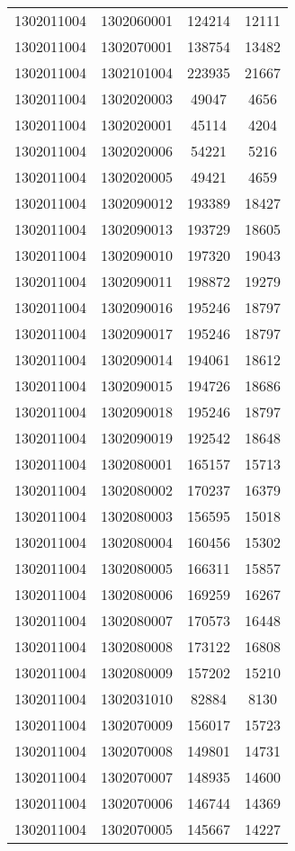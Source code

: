 \begin{longtable}{llcc}
1302011004 & 1302060001 & 124214 & 12111\\
1302011004 & 1302070001 & 138754 & 13482\\
1302011004 & 1302101004 & 223935 & 21667\\
1302011004 & 1302020003 & 49047 & 4656\\
1302011004 & 1302020001 & 45114 & 4204\\
1302011004 & 1302020006 & 54221 & 5216\\
1302011004 & 1302020005 & 49421 & 4659\\
1302011004 & 1302090012 & 193389 & 18427\\
1302011004 & 1302090013 & 193729 & 18605\\
1302011004 & 1302090010 & 197320 & 19043\\
1302011004 & 1302090011 & 198872 & 19279\\
1302011004 & 1302090016 & 195246 & 18797\\
1302011004 & 1302090017 & 195246 & 18797\\
1302011004 & 1302090014 & 194061 & 18612\\
1302011004 & 1302090015 & 194726 & 18686\\
1302011004 & 1302090018 & 195246 & 18797\\
1302011004 & 1302090019 & 192542 & 18648\\
1302011004 & 1302080001 & 165157 & 15713\\
1302011004 & 1302080002 & 170237 & 16379\\
1302011004 & 1302080003 & 156595 & 15018\\
1302011004 & 1302080004 & 160456 & 15302\\
1302011004 & 1302080005 & 166311 & 15857\\
1302011004 & 1302080006 & 169259 & 16267\\
1302011004 & 1302080007 & 170573 & 16448\\
1302011004 & 1302080008 & 173122 & 16808\\
1302011004 & 1302080009 & 157202 & 15210\\
1302011004 & 1302031010 & 82884 & 8130\\
1302011004 & 1302070009 & 156017 & 15723\\
1302011004 & 1302070008 & 149801 & 14731\\
1302011004 & 1302070007 & 148935 & 14600\\
1302011004 & 1302070006 & 146744 & 14369\\
1302011004 & 1302070005 & 145667 & 14227\\

\end{longtable}

